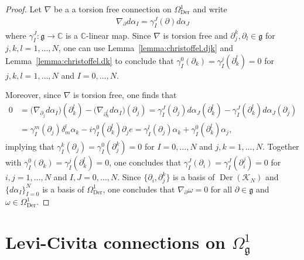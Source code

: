 \documentclass{amsart}
\newcommand{\complex}{\mathbb{C}}
\newcommand{\paraa}[1]{\big(#1\big)}
\theoremstyle{definition}
\theoremstyle{remark}
\numberwithin{equation}{section}
\newcommand{\K}{\mathcal{K}}
\newcommand{\KN}{\K_N}
\renewcommand{\d}{\partial}
\newcommand{\Der}{\operatorname{Der}}
\newcommand{\g}{\mathfrak{g}}
\newcommand{\Omegaoneg}{\Omega^1_{\g}}
\begin{document}
\begin{proof}
  Let $\nabla$ be a a torsion free connection on $\Omega_{\Der}^1$ and write
  \begin{align*}
    \nabla_{\d}d\alpha_I = \gamma_I^J(\d)d\alpha_J
  \end{align*}
  where $\gamma_I^J:\g\to\complex$ is a $\complex$-linear map. Since
  $\nabla$ is torsion free and $\d_j^k,\d_l\in\g$ for
  $j,k,l=1,\ldots,N$, one can use Lemma~\ref{lemma:christoffel.djk}
  and Lemma~\ref{lemma:christoffel.dk} to conclude that
  $\gamma_I^0(\d_k)=\gamma_I^j(\d_k^l)=0$ for $j,k,l=1,\ldots,N$ and
  $I=0,\ldots,N$.

  Moreover, since $\nabla$ is torsion free, one finds that
  \begin{align*}
    0 &= \paraa{\nabla_{\d_j}d\alpha_I}(\d_k^l)-\paraa{\nabla_{\d_k^l}d\alpha_I}(\d_j)
        =\gamma_I^J(\d_j)d\alpha_J(\d_k^l)
        -\gamma_I^J(\d_k^l)d\alpha_J(\d_j)\\
      &= \gamma_I^m(\d_j)\delta_m^l\alpha_k-i\gamma_I^0(\d_k^l)\d_je
        =\gamma_I^l(\d_j)\alpha_k+\gamma_I^0(\d_k^l)\alpha_j,
  \end{align*}
  implying that $\gamma_I^k(\d_j)=\gamma_I^0(\d_j^k)=0$ for
  $I=0,\ldots,N$ and $j,k=1,\ldots,N$. Together with
  $\gamma_I^0(\d_k)=\gamma_I^j(\d_k^l)=0$, one concludes that
  $\gamma_I^J(\d_i)=\gamma_I^J(\d_i^j)=0$ for $i,j=1,\ldots,N$ and
  $I,J=0,\ldots,N$. Since $\{\d_i,\d_j^k\}$ is a basis of $\Der(\KN)$
  and $\{d\alpha_I\}_{I=0}^N$ is a basis of $\Omega_{\Der}^1$, one concludes
  that $\nabla_{\d}\omega=0$ for all $\d\in\g$ and
  $\omega\in\Omega_{\Der}^1$.
\end{proof}

\section{Levi-Civita connections on $\Omegaoneg$}
\label{sec:LC.Omegaoneg}
\end{document}
